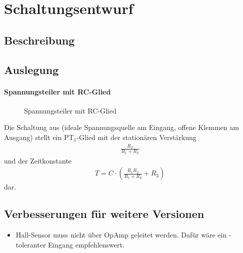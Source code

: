 
\chapter{Schaltungsentwurf}


\section{Beschreibung}


\section{Auslegung}



\subsubsection{Spannungsteiler mit RC-Glied}

\begin{figure}[htb]%
	\centering
	\caption{Spannungsteiler mit RC-Glied}%
	\label{fig:VDivRC}%
\end{figure}		

Die Schaltung aus  (ideale Spannungsquelle am Eingang, offene Klemmen am Ausgang) stellt ein PT$_1$-Glied mit der stationären Verstärkung
\begin{align*}
	\frac{R_2}{R_1 + R_2}
\end{align*}
und der Zeitkonstante
\begin{align*}
	T = C \cdot \left( \frac{R_1 R_2}{R_1 + R_2} + R_3 \right)
\end{align*}
dar.



\section{Verbesserungen für weitere Versionen}

\begin{itemize}
	\item Hall-Sensor muss nicht über OpAmp geleitet werden. Dafür wäre ein -toleranter Eingang empfehlenswert.
\end{itemize}


